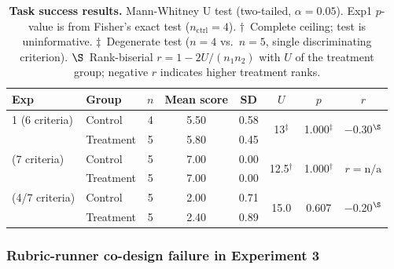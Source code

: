 \documentclass[11pt,a4paper]{article}
\begin{document}
\begin{table}[h]
\centering
\caption{\small \textbf{Task success results.} Mann-Whitney U test (two-tailed,
$\alpha{=}0.05$). Exp1 $p$-value is from Fisher's exact test ($n_\text{ctrl}{=}4$).
$\dagger$~Complete ceiling; test is uninformative.
$\ddagger$~Degenerate test ($n{=}4$ vs.\ $n{=}5$, single discriminating criterion).
$\S$~Rank-biserial $r = 1 - 2U/(n_1 n_2)$ with $U$ of the treatment group; negative $r$ indicates higher treatment ranks.}
\label{tab:results}
\begin{tabular}{llcccccc}
\toprule
Exp & Group & $n$ & Mean score & SD & $U$ & $p$ & $r$ \\
\midrule
1 (6 criteria) & Control   & 4 & 5.50 & 0.58 & \multirow{2}{*}{13$^\ddagger$} & \multirow{2}{*}{1.000$^\ddagger$} & \multirow{2}{*}{$-$0.30$^\S$} \\
               & Treatment & 5 & 5.80 & 0.45 &     &       &       \\
\addlinespace
2 (7 criteria) & Control   & 5 & 7.00 & 0.00 & \multirow{2}{*}{12.5$^\dagger$} & \multirow{2}{*}{1.000$^\dagger$} & \multirow{2}{*}{$r{=}\text{n/a}$} \\
               & Treatment & 5 & 7.00 & 0.00 &      &       &       \\
\addlinespace
3 (4/7 criteria) & Control   & 5 & 2.00 & 0.71 & \multirow{2}{*}{15.0} & \multirow{2}{*}{0.607} & \multirow{2}{*}{$-$0.20$^\S$} \\
               & Treatment & 5 & 2.40 & 0.89 &      &       &       \\
\bottomrule
\end{tabular}
\end{table}

\subsubsection{Rubric-runner co-design failure in Experiment 3}
\label{subsec:codesign}
\end{document}

